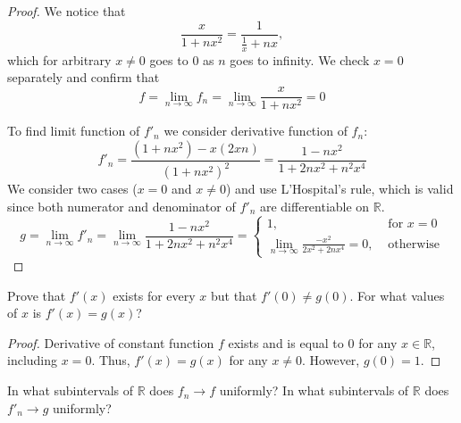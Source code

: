 \documentclass{article}
\newcommand{\R}{\mathbb{R}}
\begin{document}
\begin{proof}

We notice that
\[ \frac{x}{1 + nx^2} = \frac{1}{\frac{1}{x}+nx}, \]
which for arbitrary $x \neq 0$ goes to $0$ as $n$ goes to infinity.
We check $x=0$ separately and confirm that
\[ f = \lim_{n\to\infty} f_n = \lim_{n\to\infty} \frac{x}{1 + nx^2} = 0 \]

To find limit function of $f'_n$ we consider derivative function of $f_n$:
\[ f'_n = \frac{(1+nx^2) - x (2xn)}{(1+nx^2)^2} = \frac{1-nx^2}{1+2nx^2+n^2x^4} \]
We consider two cases ($x=0$ and $x\neq0$) and use L'Hospital's rule, which is valid since both numerator and denominator of $f'_n$ are differentiable on $\R$.
\[
    g
    = \lim_{n\to\infty } f'_n 
    = \lim_{n\to\infty } \frac{1-nx^2}{1+2nx^2+n^2x^4} 
    =
    \begin{cases}
        1, & \text{ for $x = 0$} \\
        \lim_{n\to\infty} \frac{-x^2}{2x^2+2nx^4} = 0, & \text{ otherwise}
    \end{cases}
\]

\end{proof}

\begin{tcolorbox}
Prove that $f'(x)$ exists for every $x$ but that $f'(0) \neq g(0)$. For what values of $x$ is $f'(x) = g(x)$? 
\end{tcolorbox}

\begin{proof}

Derivative of constant function $f$ exists and is equal to $0$ for any $x \in \R$, including $x=0$.
Thus, $f'(x) = g(x)$ for any $x\neq0$. However, $g(0)=1$.

\end{proof}

\begin{tcolorbox}
In what subintervals of $\R$ does $f_n \to f$ uniformly?
In what subintervals of $\R$ does $f'_n \to g$ uniformly?
\end{tcolorbox}
\end{document}
